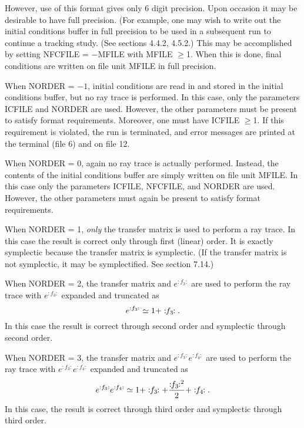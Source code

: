      However, use of this format gives only 6 digit precision.  Upon
occasion it may be desirable to have full precision.  (For example, one may
wish to write out the initial conditions buffer in full precision to be
used in a subsequent \Mary run to continue a tracking study.  (See
sections 4.4.2, 4.5.2.)  This may be accomplished by setting NFCFILE =
$-$MFILE with MFILE $\geq$1.  When this is done, final conditions are written on
file unit MFILE in full precision.

     When NORDER = $-1$, initial conditions are read in and stored in the
initial conditions buffer, but no ray trace is performed.  In this case,
only the parameters ICFILE and NORDER are used.  However, the other
parameters must be present to satisfy format requirements.  Moreover, one
must have ICFILE $\geq$1.  If this requirement is violated, the \Mary run is
terminated, and error messages are printed at the terminal (file 6) and on
file 12.

     When NORDER = 0, again no ray trace is actually performed.  Instead,
the contents of the initial conditions buffer are simply written on file unit
MFILE.  In this case only the parameters ICFILE, NFCFILE, and NORDER are
used.  However, the other parameters must again be present to satisfy
format requirements.

     When NORDER = 1, {\em only } the transfer matrix is used to perform a ray
trace.  In this case the result is correct only through first (linear)
order. It is exactly symplectic because the transfer matrix is symplectic.  (If the transfer matrix is not symplectic, it may be symplectified.  See section 7.14.)

     When NORDER = 2, the transfer matrix and $e^{:f_3:}$ are used to perform
the ray trace with $e^{:f_3:}$ expanded and truncated as
\begin{equation}
                            e^{:f_3:} \simeq 1 + \Lieop(f_3).
\end{equation}
In this case the result is correct through second order and symplectic
through second order.

     When NORDER = 3, the transfer matrix and $e^{:f_3:} e^{:f_4:}$ are used
to perform the ray trace with $e^{:f_3:} e^{:f_4:}$ expanded and truncated as
\begin{equation}
e^{:f_3:} e^{:f_4:} \simeq 1 + \Lieop(f_3) + \frac{\Lieop(f_3)^2}{2} + \Lieop(f_4).
\end{equation}
In this case, the result is correct through third order and symplectic
through third order.

